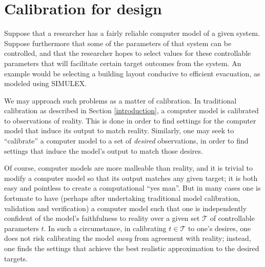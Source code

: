 \documentclass{article}
\begin{document}
\section{Calibration for design}\label{calib_for_design}


Suppose that a researcher has a fairly reliable computer model of a given system. Suppose furthermore that some of the parameters of that system can be controlled, and that the researcher hopes to select values for these controllable parameters that will facilitate certain target outcomes from the system. An example would be selecting a building layout conducive to efficient evacuation, as modeled using SIMULEX.

We may approach such problems as a matter of calibration. In traditional calibration as described in Section \ref{introduction}, a computer model is calibrated to observations of reality. This is done in order to find settings for the computer model that induce its output to match reality. Similarly, one may seek to ``calibrate'' a computer model to a set of \emph{desired} observations, in order to find settings that induce the model's output to match those desires. 

Of course, computer models are more malleable than reality, and it is trivial to modify a computer model so that its output matches any given target; it is both easy and pointless to create a computational ``yes man''. But in many cases one is fortunate to have (perhaps after undertaking traditional model calibration, validation and verification) a computer model such that one is independently confident of the model's faithfulness to reality over a given set $\mathcal T$ of controllable parameters $t$. In such a circumstance, in calibrating $t\in\mathcal T$ to one's desires, one does not risk calibrating the model \emph{away} from agreement with reality; instead, one finds the settings that achieve the best realistic approximation to the desired targets.
\end{document}
